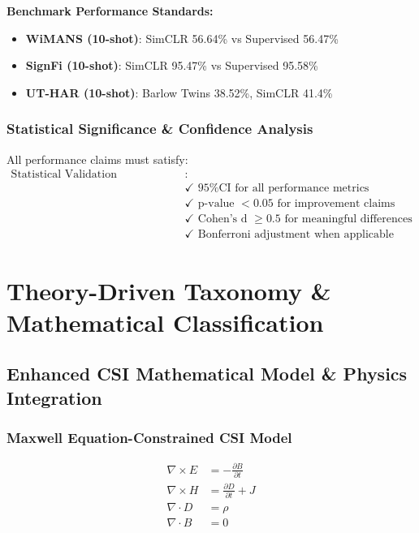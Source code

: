 \documentclass[journal]{IEEEtran}
\newcommand{\maxwell}[1]{\nabla \times #1}
\begin{document}
\textbf{Benchmark Performance Standards:}
\begin{itemize}
\item \textbf{WiMANS (10-shot)}: SimCLR 56.64\% vs Supervised 56.47\%
\item \textbf{SignFi (10-shot)}: SimCLR 95.47\% vs Supervised 95.58\%
\item \textbf{UT-HAR (10-shot)}: Barlow Twins 38.52\%, SimCLR 41.4\%
\end{itemize}

\subsubsection{Statistical Significance \& Confidence Analysis}
All performance claims must satisfy:
\begin{align}
\text{Statistical Validation Framework} &: \nonumber \\
&\checkmark \text{ 95\% CI for all performance metrics} \nonumber \\
&\checkmark \text{ p-value } < 0.05 \text{ for improvement claims} \nonumber \\
&\checkmark \text{ Cohen's d } \geq 0.5 \text{ for meaningful differences} \nonumber \\
&\checkmark \text{ Bonferroni adjustment when applicable}
\label{eq:statistical_validation}
\end{align}

\section{Theory-Driven Taxonomy \& Mathematical Classification}
\label{sec:taxonomy}

\subsection{Enhanced CSI Mathematical Model \& Physics Integration}

\subsubsection{Maxwell Equation-Constrained CSI Model}
\begin{align}
\maxwell{E} &= -\frac{\partial B}{\partial t} \label{eq:faraday} \\
\maxwell{H} &= \frac{\partial D}{\partial t} + J \label{eq:ampere} \\
\nabla \cdot D &= \rho \label{eq:gauss} \\
\nabla \cdot B &= 0 \label{eq:magnetic}
\end{align}
\end{document}

